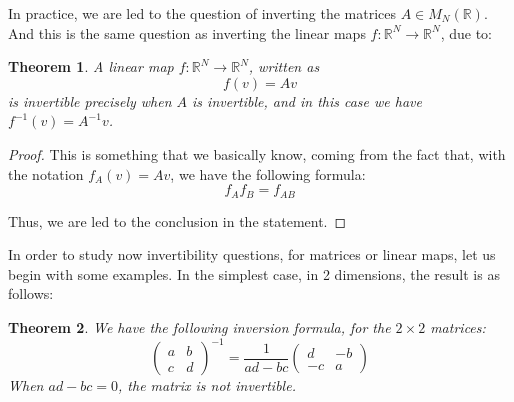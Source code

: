 \documentclass[12pt]{amsbook}
\newtheorem{theorem}{Theorem}[chapter]
\begin{document}
In practice, we are led to the question of inverting the matrices $A\in M_N(\mathbb R)$. And this is the same question as inverting the linear maps $f:\mathbb R^N\to\mathbb R^N$, due to:


\begin{theorem}
A linear map $f:\mathbb R^N\to\mathbb R^N$, written as
$$f(v)=Av$$
is invertible precisely when $A$ is invertible, and in this case we have $f^{-1}(v)=A^{-1}v$.
\end{theorem}

\begin{proof}
This is something that we basically know, coming from the fact that, with the notation $f_A(v)=Av$, we have the following formula:
$$f_Af_B=f_{AB}$$

Thus, we are led to the conclusion in the statement.
\end{proof}

In order to study now invertibility questions, for matrices or linear maps, let us begin with some examples. In the simplest case, in 2 dimensions, the result is as follows:


\begin{theorem}
We have the following inversion formula, for the $2\times2$ matrices:
$$\begin{pmatrix}a&b\\ c&d\end{pmatrix}^{-1}
=\frac{1}{ad-bc}\begin{pmatrix}d&-b\\ -c&a\end{pmatrix}$$
When $ad-bc=0$, the matrix is not invertible.
\end{theorem}
\end{document}
